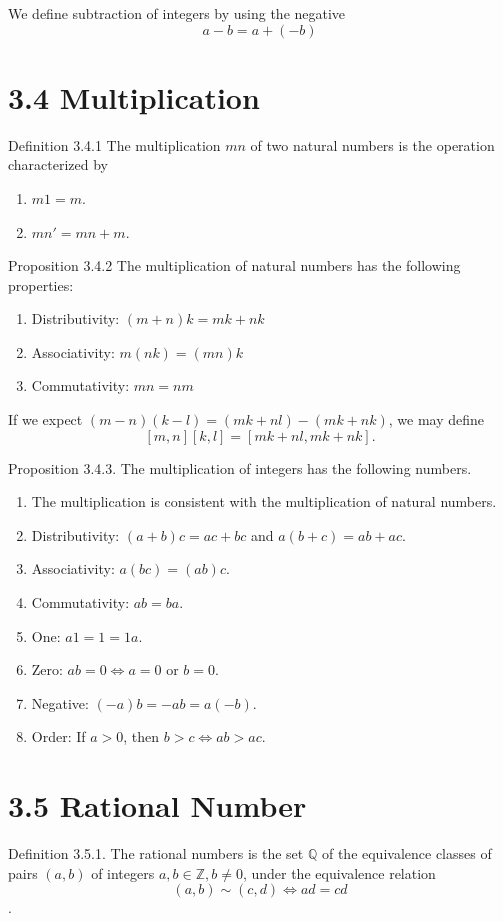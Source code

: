 \documentclass[12pt]{report}
\begin{document}
We define subtraction of integers by using the negative$$a-b = a+(-b)$$

\section*{3.4 Multiplication}
Definition 3.4.1 The multiplication $mn$ of two natural numbers is the operation characterized by 
\begin{enumerate}
    \item $m1 = m$.
    \item $mn' = mn + m$.
\end{enumerate}

Proposition 3.4.2 The multiplication of natural numbers has the following properties:
\begin{enumerate}
    \item Distributivity: $(m+n)k = mk + nk$
    \item Associativity: $m(nk) = (mn)k$
    \item Commutativity: $mn = nm$
\end{enumerate}

If we expect $(m-n)(k-l) = (mk+nl) - (mk+nk)$, we may define $$[m,n][k,l] = [mk+nl ,mk+nk].$$

Proposition 3.4.3. The multiplication of integers has the following numbers.
\begin{enumerate}
    \item The multiplication is consistent with the multiplication of natural numbers.
    \item Distributivity: $(a+b)c = ac+bc$ and $a(b+c) = ab+ac$.
    \item Associativity: $a(bc) = (ab)c$.
    \item Commutativity: $ab = ba$.
    \item One: $a1 = 1 = 1a$.
    \item Zero: $ab = 0 \Longleftrightarrow a = 0 \text{ or } b=0$.
    \item Negative: $(-a)b = -ab = a(-b)$.
    \item Order: If $a>0$, then $b > c \Longleftrightarrow ab>ac$.
\end{enumerate}



\section*{3.5 Rational Number}
Definition 3.5.1. The rational numbers is the set $\mathbb{Q}$ of the equivalence classes of pairs $(a,b)$ of integers $a,b \in \mathbb{Z}, b \neq 0$, under the equivalence relation $$(a,b) \sim (c,d) \Longleftrightarrow ad = cd$$.
\end{document}
